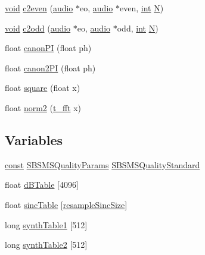 \begin{DoxyCompactItemize}
\item 
\hyperlink{sound_8c_ae35f5844602719cf66324f4de2a658b3}{void} \hyperlink{namespace__sbsms___ab7989f41f4d72a03c02f621025d6958a}{c2even} (\hyperlink{namespace__sbsms___a11786cc5bd221ff534972ae350477324}{audio} $\ast$eo, \hyperlink{namespace__sbsms___a11786cc5bd221ff534972ae350477324}{audio} $\ast$even, \hyperlink{xmltok_8h_a5a0d4a5641ce434f1d23533f2b2e6653}{int} \hyperlink{rfft2d_test_m_l_8m_af6d1246b147a7c5763d9fc83082020ff}{N})
\item 
\hyperlink{sound_8c_ae35f5844602719cf66324f4de2a658b3}{void} \hyperlink{namespace__sbsms___a0cb38733f32d84980a312f6787ce89f7}{c2odd} (\hyperlink{namespace__sbsms___a11786cc5bd221ff534972ae350477324}{audio} $\ast$eo, \hyperlink{namespace__sbsms___a11786cc5bd221ff534972ae350477324}{audio} $\ast$odd, \hyperlink{xmltok_8h_a5a0d4a5641ce434f1d23533f2b2e6653}{int} \hyperlink{rfft2d_test_m_l_8m_af6d1246b147a7c5763d9fc83082020ff}{N})
\item 
float \hyperlink{namespace__sbsms___a9a161052e83b017009da47347c0d707c}{canon\+PI} (float ph)
\item 
float \hyperlink{namespace__sbsms___a8968c25a1b5a6cfd2cc3d967685f3037}{canon2\+PI} (float ph)
\item 
float \hyperlink{namespace__sbsms___a5367bf366f68817ca0f6af981d0ec633}{square} (float x)
\item 
float \hyperlink{namespace__sbsms___ad44df36699b413b6d61a3444e345463c}{norm2} (\hyperlink{namespace__sbsms___af5c6f976b2da21c36853e3b0c5995a54}{t\+\_\+fft} x)
\end{DoxyCompactItemize}
\subsection*{Variables}
\begin{DoxyCompactItemize}
\item 
\hyperlink{getopt1_8c_a2c212835823e3c54a8ab6d95c652660e}{const} \hyperlink{struct__sbsms___1_1_s_b_s_m_s_quality_params}{S\+B\+S\+M\+S\+Quality\+Params} \hyperlink{namespace__sbsms___add7c6b67483602e252a77ddc635537a8}{S\+B\+S\+M\+S\+Quality\+Standard}
\item 
float \hyperlink{namespace__sbsms___a3299f3742954168177b5e72c2c58fc28}{d\+B\+Table} \mbox{[}4096\mbox{]}
\item 
float \hyperlink{namespace__sbsms___a1c3af671988eb8569c007f81fa4644e1}{sinc\+Table} \mbox{[}\hyperlink{sinc_coeffs_8h_a82f2c6e4d47f62f6b65c5887eb096fd5a8dd381df02be3affd4e9c066aeac9ba4}{resample\+Sinc\+Size}\mbox{]}
\item 
long \hyperlink{namespace__sbsms___a4fd8a5666954677b7bd6cabfd5905592}{synth\+Table1} \mbox{[}512\mbox{]}
\item 
long \hyperlink{namespace__sbsms___abeb508b163b33b08ec80ead37421be5a}{synth\+Table2} \mbox{[}512\mbox{]}
\end{DoxyCompactItemize}


